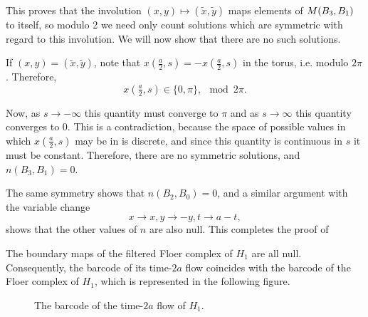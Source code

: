 This proves that the involution $(x,y) \mapsto (\tilde x, \tilde y)$ maps elements of $M(B_3,B_1)$ to itself, so modulo 2 we need only count solutions which are symmetric with regard to this involution. We will now show that there are no such solutions.

If $(x,y) = (\tilde x, \tilde y)$, note that $x(\tfrac a 2, s) = - x(\tfrac a 2, s)$ in the torus, i.e. modulo $2\pi$. Therefore,
\begin{equation}
x(\tfrac a 2, s) \in \{0,\pi\}, \mod 2\pi.
\end{equation}

Now, as $s \to -\infty$ this quantity must converge to $\pi$ and as $s \to \infty$ this quantity converges to $0$. This is a contradiction, because the space of possible values in which $x(\tfrac a 2, s)$ may be in is discrete, and since this quantity is continuous in $s$ it must be constant. Therefore, there are no symmetric solutions, and $n(B_3, B_1) = 0$.

The same symmetry shows that $n(B_2, B_0) = 0$, and a similar argument with the variable change
\begin{equation}
x \to x, y \to -y, t \to a-t,
\end{equation}
shows that the other values of $n$ are also null. This completes the proof of

\begin{prop}
The boundary maps of the filtered Floer complex of $H_1$ are all null. Consequently, the barcode of its time-$2a$ flow coincides with the barcode of the Floer complex of $H_1$, which is represented in the following figure.

\begin{figure}[H]
\centering
{}
\caption{The barcode of the time-$2a$ flow of $H_1$.}
\end{figure}

\end{prop}